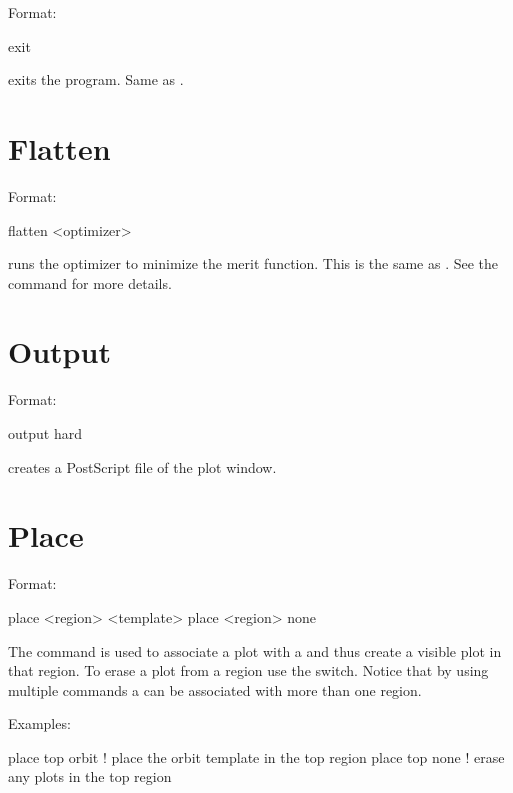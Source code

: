 Format:
\begin{example}
  exit
\end{example}

\vskip 0.2in
 exits the program. Same as .

\section{Flatten}
\label{s:flatten}

Format:
\begin{example}
  flatten <optimizer>
\end{example}

\vskip 0.2in
 runs the optimizer to minimize the merit function. This is the 
same as . See the  command for more details.

\section{Output}
\label{s:output}

Format:
\begin{example}
  output hard
\end{example}

\vskip 0.2in
 creates a PostScript file of the plot window. 

\section{Place}
\label{s:place}

Format:
\begin{example}
  place <region> <template>
  place <region> none
\end{example}

\vskip 0.2in The  command is used to associate a
 plot with a  and thus create a visible
plot in that region. To erase a plot from a region use the 
switch. Notice that by using multiple  commands a
 can be associated with more than one region. 

Examples:
\begin{example}
  place top orbit  ! place the orbit template in the top region
  place top none   ! erase any plots in the top region
\end{example}

